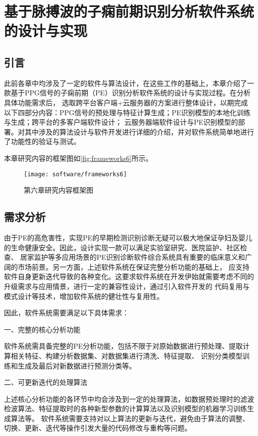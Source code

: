 \chapter{基于脉搏波的子痫前期识别分析软件系统的设计与实现}
\section{引言}
此前各章中均涉及了一定的软件与算法设计，在这些工作的基础上，本章介绍了一款基于PPG信号的子痫前期（PE）识别分析软件系统的设计与实现过程。在分析具体功能需求后，
选取跨平台客户端+云服务器的方案进行整体设计，以期完成以下四部分内容：PPG信号的预处理与特征计算生成；PE识别模型的本地化训练与生成；跨平台的多客户端软件设计；
云服务器端软件设计与PE识别模型的部署。对其中涉及的算法设计与软件开发进行详细的介绍，并对软件系统简单地进行了功能性的验证与测试。

本章研究内容的框架图如\autoref{fig:frameworks6}所示。

\begin{figure}[htbp]
    \centering
    \texttt{[image: software/frameworks6]}
    \caption{\label{fig:frameworks6}第六章研究内容框架图}
\end{figure}

\section{需求分析}
由于PE的高危害性，实现PE的早期检测识别诊断无疑可以极大地保证孕妇及婴儿的生命健康安全。因此，设计实现一款可以满足实验室研究、医院监护、社区检查、
居家监护等多应用场景的PE识别诊断软件综合系统具有重要的临床意义和广阔的市场前景。另一方面，上述软件系统在保证完整分析功能的基础上，
应支持软件自身更新迭代导致的各种变化。这要求软件系统在开发伊始就需要考虑不同的升级需求与应用情景，进行一定的兼容性设计，通过引入软件开发的
代码复用与模式设计等技术，增加软件系统的健壮性与复用性\cite{CJ2020,Enrich2018,Gamma1993}。

因此，软件系统需要满足以下具体需求：

一、完整的核心分析功能

软件系统需具备完整的PE分析功能，包括不限于对原始数据进行预处理、提取计算相关特征、构建分析数据集、对数据集进行清洗、特征提取、
识别分类模型训练和生成及最后对新数据进行预测分类等。

二、可更新迭代的处理算法

上述核心分析功能的各环节中均会涉及到一定的处理算法，如数据预处理时的滤波检波算法、特征提取时的各种新型参数的计算算法以及识别模型的机器学习训练生成算法等。
软件系统需要支持对以上算法的更新与迭代，避免由于算法的调整、切换、更新、迭代等操作引发大量的代码修改与重构等问题。

